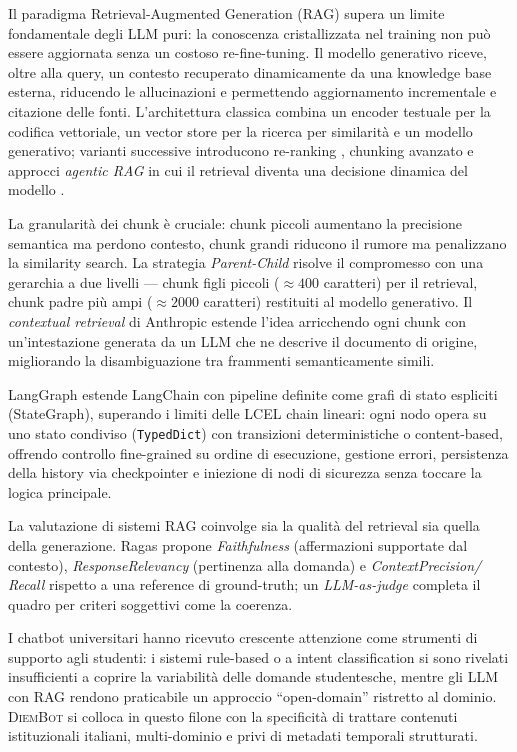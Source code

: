 \documentclass[11pt,a4paper]{article}
\newcommand{\code}[1]{\texttt{\small#1}}
\newcommand{\sys}{\textsc{DiemBot}}
\begin{document}
Il paradigma Retrieval-Augmented Generation (RAG) \citep{lewis2020rag} supera un limite
fondamentale degli LLM puri: la conoscenza cristallizzata nel training non può essere
aggiornata senza un costoso re-fine-tuning. Il modello generativo riceve, oltre alla query,
un contesto recuperato dinamicamente da una knowledge base esterna, riducendo le
allucinazioni e permettendo aggiornamento incrementale e citazione delle fonti.
L'architettura classica combina un encoder testuale per la codifica vettoriale, un
vector store per la ricerca per similarità e un modello generativo; varianti successive
introducono re-ranking \citep{nogueira2020passage}, chunking avanzato e approcci
\emph{agentic RAG} in cui il retrieval diventa una decisione dinamica del modello
\citep{shi2023replug}.

La granularità dei chunk è cruciale: chunk piccoli aumentano la precisione semantica ma
perdono contesto, chunk grandi riducono il rumore ma penalizzano la similarity search. La
strategia \emph{Parent-Child} \citep{langchain2023parentdoc} risolve il compromesso con una
gerarchia a due livelli --- chunk figli piccoli ($\approx 400$ caratteri) per il retrieval,
chunk padre più ampi ($\approx 2000$ caratteri) restituiti al modello generativo. Il
\emph{contextual retrieval} di Anthropic \citep{anthropic2024contextual} estende l'idea
arricchendo ogni chunk con un'intestazione generata da un LLM che ne descrive il documento
di origine, migliorando la disambiguazione tra frammenti semanticamente simili.

LangGraph \citep{langgraph2024} estende LangChain con pipeline definite come grafi di stato
espliciti (StateGraph), superando i limiti delle LCEL chain lineari: ogni nodo opera su uno
stato condiviso (\code{TypedDict}) con transizioni deterministiche o content-based, offrendo
controllo fine-grained su ordine di esecuzione, gestione errori, persistenza della history
via checkpointer e iniezione di nodi di sicurezza senza toccare la logica principale.

La valutazione di sistemi RAG coinvolge sia la qualità del retrieval sia quella della
generazione. Ragas \citep{es2023ragas} propone \emph{Faithfulness} (affermazioni supportate
dal contesto), \emph{ResponseRelevancy} (pertinenza alla domanda) e \emph{ContextPrecision/
Recall} rispetto a una reference di ground-truth; un \emph{LLM-as-judge} \citep{zheng2023judging}
completa il quadro per criteri soggettivi come la coerenza.

I chatbot universitari hanno ricevuto crescente attenzione come strumenti di supporto agli
studenti: i sistemi rule-based o a intent classification \citep{smutny2020chatbots,
bansal2019systematic} si sono rivelati insufficienti a coprire la variabilità delle domande
studentesche, mentre gli LLM con RAG rendono praticabile un approccio ``open-domain''
ristretto al dominio. \sys{} si colloca in questo filone con la specificità di trattare
contenuti istituzionali italiani, multi-dominio e privi di metadati temporali strutturati.
\end{document}
